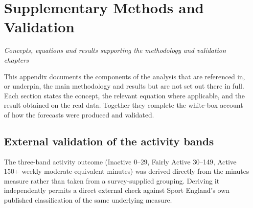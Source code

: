 \documentclass[ %
                    author={Ashrey Ashrey, Sanya Kapoor, Trisha Sharma, Yash Bhooshan Pandloskar},
                supervisor={Dr. Dalila O’Grady},
                    degree={MSc},
                     title={Using machine learning to forecast physical activity participation, volunteering and activity patterns in London},
                  subtitle={},
                      type={},
                      year={2021}]{dissertation}
\begin{document}
%
%

\backmatter





\appendix

\chapter{Supplementary Methods and Validation}
\label{appx:supplementary-methods}

\noindent
\emph{Concepts, equations and results supporting the methodology and validation chapters}

\noindent
This appendix documents the components of the analysis that are referenced in, or underpin, the main methodology and results but are not set out there in full. Each section states the concept, the relevant equation where applicable, and the result obtained on the real data. Together they complete the white-box account of how the forecasts were produced and validated.

\section{External validation of the activity bands}

\noindent
The three-band activity outcome (Inactive 0--29, Fairly Active 30--149, Active 150+ weekly moderate-equivalent minutes) was derived directly from the minutes measure rather than taken from a survey-supplied grouping. Deriving it independently permits a direct external check against Sport England's own published classification of the same underlying measure.
\end{document}
